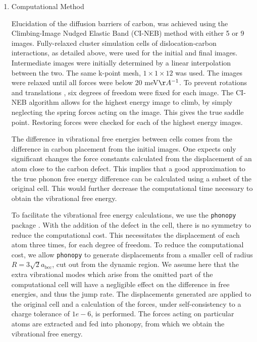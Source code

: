 \documentclass[a4paper,12pt,oneside,print,numbered,index,PageStyleIII]{PhDThesisPSnPDF}
\begin{document}
\begin{enumerate}
\item Computational Method
\label{sec:orgc08a0cf}

Elucidation of the diffusion barriers of carbon, was achieved using the Climbing-Image Nudged
Elastic Band (CI-NEB) method with either 5 or 9 images. Fully-relaxed cluster simulation cells of
dislocation-carbon interactions, as detailed above, were used for the initial and final
images. Intermediate images were initially determined by a linear interpolation between the
two. The same k-point mesh, \(1\times 1 \times 12\) was used. The images were relaxed until all
forces were below 20 meV\(\AA^{-1}\). To prevent rotations and translations \cite{berne1998classical},
six degrees of freedom were fixed for each image. The CI-NEB algorithm allows for the highest
energy image to climb, by simply neglecting the spring forces acting on the image. This gives the
true saddle point. Restoring forces were checked for each of the highest energy images.



The difference in vibrational free energies between cells comes from the difference in carbon
placement from the initial images. One expects only significant changes the force constants calculated from the
displacement of an atom close to the carbon defect. This implies that a good
approximation to the true phonon free energy difference can be calculated using a subset of the
original cell. This would further decrease the computational time necessary to obtain the
vibrational free energy.

To facilitate the vibrational free energy calculations, we use the \texttt{phonopy} package
\cite{phonopy}. With the addition of the defect in the cell, there is no symmetry to reduce the
computational cost. This necessitates the displacement of each atom three
times, for each degree of freedom. To reduce
the computational cost, we allow \texttt{phonopy} to generate displacements from a smaller cell of
radius \(R = 3\sqrt{2}a_\text{bcc}\), cut out from the dynamic region. We assume here that the
extra vibrational modes which arise from the omitted part of the computational cell will have a
negligible effect on the difference in free energies, and thus the jump rate. The displacements
generated are applied to the original cell and a calculation of the forces, under
self-consistency to a charge tolerance of \(1e-6\), is performed. The forces acting on particular
atoms are extracted and fed into phonopy, from which we obtain the vibrational free energy.



\end{enumerate}
\end{document}

